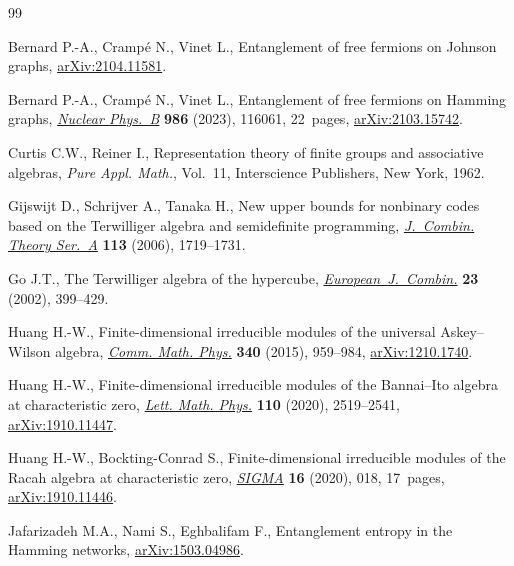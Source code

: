 \begin{thebibliography}{99}
\footnotesize\itemsep=0pt

Bernard P.-A., Cramp\'e N., Vinet L., Entanglement of free fermions on Johnson
 graphs, \href{https://arxiv.org/abs/2104.11581}{arXiv:2104.11581}.

Bernard P.-A., Cramp\'e N., Vinet L., Entanglement of free fermions on {H}amming
 graphs, \href{https://doi.org/10.1016/j.nuclphysb.2022.116061}{\textit{Nuclear Phys.~B}} \textbf{986} (2023), 116061, 22~pages,
 \href{https://arxiv.org/abs/2103.15742}{arXiv:2103.15742}.

Curtis C.W., Reiner I., Representation theory of finite groups and associative
 algebras, \textit{Pure Appl. Math.}, Vol.~11, Interscience Publishers, New
 York, 1962.

Gijswijt D., Schrijver A., Tanaka H., New upper bounds for nonbinary codes
 based on the {T}erwilliger algebra and semidefinite programming,
 \href{https://doi.org/10.1016/j.jcta.2006.03.010}{\textit{J.~Combin. Theory Ser.~A}} \textbf{113} (2006), 1719--1731.

Go J.T., The {T}erwilliger algebra of the hypercube,
 \href{https://doi.org/10.1006/eujc.2000.0514}{\textit{European~J.~Combin.}} \textbf{23} (2002), 399--429.

Huang H.-W., Finite-dimensional irreducible modules of the universal
 {A}skey--{W}ilson algebra, \href{https://doi.org/10.1007/s00220-015-2467-9}{\textit{Comm. Math. Phys.}} \textbf{340} (2015),
 959--984, \href{https://arxiv.org/abs/1210.1740}{arXiv:1210.1740}.

Huang H.-W., Finite-dimensional irreducible modules of the {B}annai--{I}to
 algebra at characteristic zero, \href{https://doi.org/10.1007/s11005-020-01306-9}{\textit{Lett. Math. Phys.}} \textbf{110}
 (2020), 2519--2541, \href{https://arxiv.org/abs/1910.11447}{arXiv:1910.11447}.

Huang H.-W., Bockting-Conrad S., Finite-dimensional irreducible modules of the
 {R}acah algebra at characteristic zero, \href{https://doi.org/10.3842/SIGMA.2020.018}{\textit{SIGMA}} \textbf{16} (2020),
 018, 17~pages, \href{https://arxiv.org/abs/1910.11446}{arXiv:1910.11446}.

Jafarizadeh M.A., Nami S., Eghbalifam F., Entanglement entropy in the {H}amming
 networks, \href{https://arxiv.org/abs/1503.04986}{arXiv:1503.04986}.


\end{thebibliography}
